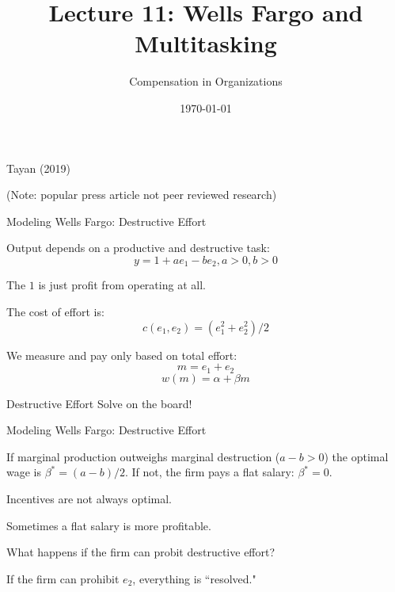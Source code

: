 \documentclass[aspectratio=169,usenames,dvipsnames]{beamer}
\title[diss]{Lecture 11: Wells Fargo and Multitasking} %
\author{Compensation in Organizations} %
\institute[shortinst]{Jacob Kohlhepp}
\date{\today} %
\newenvironment{wideitemize}{\itemize\addtolength{\itemsep}{10pt}}{\enditemize}
\begin{document}
\begin{frame}
\titlepage %

\end{frame}
\begin{frame}
\centering
    \huge Tayan (2019) 
    
    \normalsize (Note: popular press article not peer reviewed research)
\end{frame}


\begin{frame}{Modeling Wells Fargo: Destructive Effort}

\begin{wideitemize}
    \item Output depends on a productive and destructive task:
    \[y = 1+  ae_1 -b e_2, a>0, b>0\]
    \item The $1$ is just profit from operating at all.
    \item The cost of effort is:
    \[c(e_1, e_2) = (e_1^2+e_2^2)/2 \]
      \item We measure and pay only based on total effort:
    \[m=e_1+e_2\]
    \[w(m)=\alpha + \beta m\]
\end{wideitemize}
\end{frame}


\begin{frame}{Destructive Effort}
\centering
    \huge Solve on the board!

\end{frame}


\begin{frame}{Modeling Wells Fargo: Destructive Effort}
\begin{theorem}
    If marginal production outweighs marginal destruction ($a-b>0$) the optimal wage is $\beta^*=(a-b)/2$. If not, the firm pays a flat salary: $\beta^*=0$.
\end{theorem}
\begin{wideitemize}
    \item Incentives are not always optimal.
    \item Sometimes a flat salary is more profitable.
    \item What happens if the firm can probit destructive effort?
    \pause
    \item If the firm can prohibit $e_2$, everything is ``resolved."
\end{wideitemize}
\end{frame}
\end{document}
